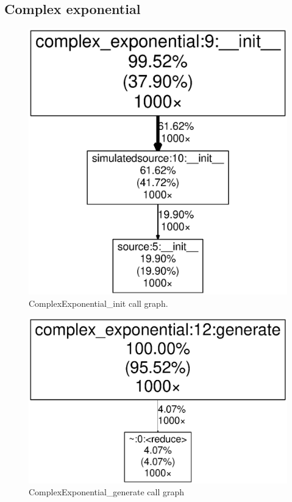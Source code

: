 \documentclass[a4paper, openany, oneside]{memoir}
\begin{document}
\subsection{Complex exponential}
\label{sub:complex_exponential}

\begin{figure}[H]
    \centering
    \includegraphics[width=0.8\linewidth]{ComplexExponential_init}
    \caption{ComplexExponential\_init call graph.}
    \label{fig:ComplexExponential_init}
\end{figure}

\begin{figure}[H]
    \centering
    \includegraphics[width=0.8\linewidth]{ComplexExponential_generate}
    \caption{ComplexExponential\_generate call graph}
    \label{fig:ComplexExponential_generate}
\end{figure}
\end{document}
